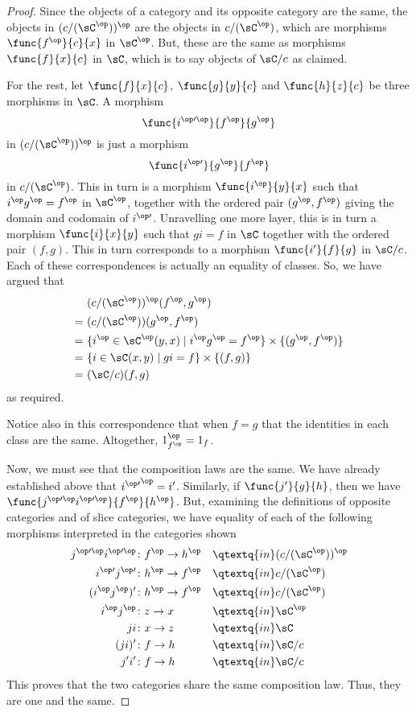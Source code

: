 \documentclass[../../main]{subfiles}
\begin{document}
\begin{proof}
	Since the objects of a category and its opposite category are the same, the
	objects in \((c/(\sC^\op))^\op\) are the objects in \(c/(\sC^\op)\), which
	are morphisms \(\func{f^\op}{c}{x}\) in \(\sC^\op\). But, these are the same
	as morphisms \(\func{f}{x}{c}\) in \(\sC\), which is to say objects of
	\(\sC/c\) as claimed.

	For the rest, let \(\func{f}{x}{c}\), \(\func{g}{y}{c}\) and
	\(\func{h}{z}{c}\) be three morphisms in \(\sC\). A morphism
	\[\func{i^{\op\prime\op}}{f^\op}{g^\op}\] in \((c/(\sC^\op))^\op\) is just a
	morphism \[\func{i^{\op\prime}}{g^\op}{f^\op}\] in \(c/(\sC^\op)\). This in
	turn is a morphism \(\func{i^\op}{y}{x}\) such that \(i^\op g^\op=f^\op\) in
	\(\sC^\op\), together with the ordered pair \((g^\op,f^\op)\) giving the
	domain and codomain of \(i^{\op\prime}\). Unravelling one more layer, this
	is in turn a morphism \(\func{i}{x}{y}\) such that \(gi=f\) in \(\sC\)
	together with the ordered pair \((f,g)\). This in turn corresponds to a
	morphism \(\func{i'}{f}{g}\) in \(\sC/c\). Each of these correspondences is
	actually an equality of classes. So, we have argued that
	\begin{align*}
		&(c/(\sC^\op))^\op(f^\op, g^\op)\\
		=\ &(c/(\sC^\op))(g^\op, f^\op)\\
		=\ &\{i^\op\in\sC^\op(y,x)\mid i^\op g^\op=f^\op\}\times\{(g^\op,f^\op)\}\\
		=\ &\{i\in\sC(x,y)\mid gi=f\}\times\{(f,g)\}\\
		=\ &(\sC/c)(f,g)\\
	\end{align*}
		as required.

	Notice also in this correspondence that when \(f=g\) that the identities in
	each class are the same. Altogether, \(1_{f^\op}^\op=1_f\).

	Now, we must see that the composition laws are the same. We have already
	established above that \({i^{\op\prime}}^\op=i'\). Similarly, if
	\(\func{j'}{g}{h}\), then we have
	\(\func{j^{\op\prime\op}i^{\op\prime\op}}{f^\op}{h^\op}\). But, examining
	the definitions of opposite categories and of slice categories, we have
	equality of each of the following morphisms interpreted in the categories
	shown
	\begin{alignat*}{2}
		j^{\op\prime\op}i^{\op\prime\op}\colon&f^\op\to h^\op&&
		\qtextq{ in }(c/(\sC^\op))^\op\\
		i^{\op\prime}j^{\op\prime}\colon&h^\op\to f^\op&&
		\qtextq{ in }c/(\sC^\op)\\
		(i^\op j^\op)'\colon&h^\op\to f^\op&&
		\qtextq{ in }c/(\sC^\op)\\
		i^\op j^\op\colon&z\to x&&\qtextq{ in }\sC^\op\\
		ji\colon&x\to z&&\qtextq{ in }\sC\\
		(ji)'\colon&f\to h&&\qtextq{ in }\sC/c\\
		j' i'\colon&f\to h&&\qtextq{ in }\sC/c
	\end{alignat*} This proves that the two
	categories share the same composition law. Thus, they are one and the same.


\end{proof}
\end{document}
